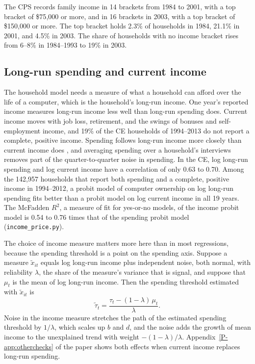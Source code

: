 \documentclass[11pt]{article}
\begin{document}
The CPS records family income in 14 brackets from 1984 to 2001, with a top bracket of \$75{,}000 or more, and in 16 brackets in 2003, with a top bracket of \$150{,}000 or more. The top bracket holds 2.3\% of households in 1984, 21.1\% in 2001, and 4.5\% in 2003. The share of households with no income bracket rises from 6--8\% in 1984--1993 to 19\% in 2003.

\subsection{Long-run spending and current income}
\label{app:spending}

The household model needs a measure of what a household can afford over the life of a computer, which is the household's long-run income. One year's reported income measures long-run income less well than long-run spending does. Current income moves with job loss, retirement, and the swings of bonuses and self-employment income, and 19\% of the CE households of 1994--2013 do not report a complete, positive income. Spending follows long-run income more closely than current income does \citep{friedman1957,meyer2003}, and averaging spending over a household's interviews removes part of the quarter-to-quarter noise in spending. In the CE, log long-run spending and log current income have a correlation of only 0.63 to 0.70. Among the 142{,}957 households that report both spending and a complete, positive income in 1994--2012, a probit model of computer ownership on log long-run spending fits better than a probit model on log current income in all 19 years. The McFadden $R^2$, a measure of fit for yes-or-no models, of the income probit model is 0.54 to 0.76 times that of the spending probit model (\texttt{income\_price.py}).

The choice of income measure matters more here than in most regressions, because the spending threshold is a point on the spending axis. Suppose a measure $\tilde x_{it}$ equals log long-run income plus independent noise, both normal, with reliability $\lambda$, the share of the measure's variance that is signal, and suppose that $\mu_t$ is the mean of log long-run income. Then the spending threshold estimated with $\tilde x_{it}$ is
\begin{equation}
\tilde\tau_t = \frac{\tau_t - (1 - \lambda)\,\mu_t}{\lambda}.
\end{equation}
Noise in the income measure stretches the path of the estimated spending threshold by $1/\lambda$, which scales up $b$ and $d$, and the noise adds the growth of mean income to the unexplained trend with weight $-(1-\lambda)/\lambda$. Appendix~\ref{P-app:otherchecks} of the paper shows both effects when current income replaces long-run spending.
\end{document}

